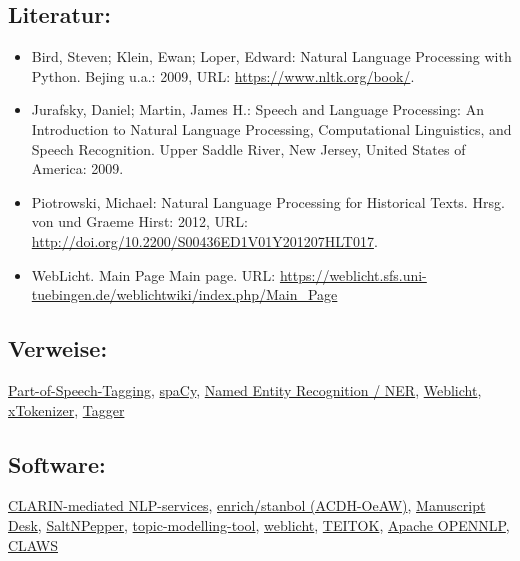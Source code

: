 \documentclass{article}
\begin{document}
        \subsection*{Literatur:}\begin{itemize}\item Bird, Steven; Klein, Ewan; Loper, Edward: Natural Language Processing with Python. Bejing u.a.: 2009, URL: \url{https://www.nltk.org/book/}.\item Jurafsky, Daniel; Martin, James H.: Speech and Language Processing: An Introduction to
                              Natural Language Processing, Computational Linguistics, and Speech
                              Recognition. Upper Saddle River, New Jersey, United States of
                                 America: 2009.\item Piotrowski, Michael: Natural Language Processing for Historical Texts. Hrsg. von  und Graeme Hirst: 2012, URL: \url{http://doi.org/10.2200/S00436ED1V01Y201207HLT017}.\item WebLicht. Main Page Main page. URL: \url{https://weblicht.sfs.uni-tuebingen.de/weblichtwiki/index.php/Main_Page}\end{itemize}\subsection*{Verweise:}\href{https://gams.uni-graz.at/o:konde.156}{Part-of-Speech-Tagging}, \href{https://gams.uni-graz.at/o:konde.170}{spaCy}, \href{https://gams.uni-graz.at/o:konde.141}{Named Entity Recognition /
                           NER}, \href{https://gams.uni-graz.at/o:konde.212}{Weblicht}, \href{https://gams.uni-graz.at/o:konde.216}{xTokenizer}, \href{https://gams.uni-graz.at/o:konde.176}{Tagger}\subsection*{Software:}\href{https://www.clarin.eu/content/services}{CLARIN-mediated NLP-services}, \href{https://enrich.acdh.oeaw.ac.at}{enrich/stanbol
                           (ACDH-OeAW)}, \href{https://manuscriptdesk.uantwerpen.be/md/Main_Page}{Manuscript
                           Desk}, \href{http://corpus-tools.org/pepper/}{SaltNPepper}, \href{https://code.google.com/archive/p/topic-modeling-tool/}{topic-modelling-tool}, \href{https://weblicht.sfs.uni-tuebingen.de/weblicht/}{weblicht}, \href{http://www.teitok.org/index.php?action=about}{TEITOK}, \href{http://opennlp.apache.org/}{Apache
                           OPENNLP}, \href{http://ucrel.lancs.ac.uk/claws/}{CLAWS
}
\end{document}
